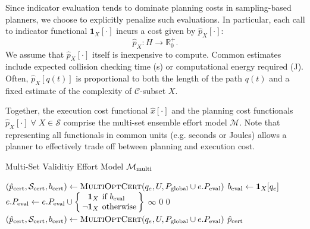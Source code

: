 Since indicator evaluation tends to dominate planning costs
in sampling-based planners,
we choose to explicitly penalize such evaluations.
In particular,
each call to indicator functional $\mathbf{1}_X[\cdot]$
incurs a cost given by ${\hat p}_X[\cdot]$:
\begin{equation}
  {\hat p}_X : H \rightarrow \mathbb{R}_0^+ .
\end{equation}
We assume that ${\hat p}_X[\cdot]$ itself is inexpensive to compute.
Common estimates include expected collision checking time (s)
or computational energy required (J).
Often, ${\hat p}_X[q(t)]$ is proportional to both
the length of the path $q(t)$
and a fixed estimate of the complexity of $\mathcal{C}$-subset $X$.

Together, the execution cost functional ${\hat x}[\cdot]$
and the planning cost functionals
${\hat p}_X[\cdot] \;\forall\; X \in \mathcal{S}$
comprise the multi-set ensemble effort model $\mathcal{M}$.
Note that representing all functionals in common units
(e.g. seconds or Joules) allows a planner
to effectively trade off between planning and execution cost.

\begin{algorithm}
\caption{Multi-Set Validitiy Effort Model
   $\mathcal{M}_{\mbox{\scriptsize multi}}$}
{\algrenewcommand\textproc{}%
\begin{algorithmic}[1]
   \State $({\hat p}_{\mbox{\scriptsize cert}}, \mathcal{S}_{\mbox{\scriptsize cert}}, b_{\mbox{\scriptsize cert}})
      \leftarrow \mbox{\sc MultiOptCert}(q_e, U,
      P_{\mbox{\scriptsize global}} \cup e.P_{\mbox{\scriptsize eval}})$
      \State $b_{\mbox{\scriptsize eval}} \leftarrow \mathbf{1}_X[q_e]$
      \State $\arraycolsep=2pt
         e.P_{\ms{eval}} \leftarrow e.P_{\ms{eval}} \cup
         \left\{\begin{array}{rl}
         \mathbf{1}_X & \mbox{if } b_{\ms{eval}} \\
         \lnot \mathbf{1}_X & \mbox{otherwise} \\
         \end{array}
         \right\}$
         \State \Return $\infty$
      \EndIf
   \EndFor
   \State \Return $0$
\EndFunction
{}
   \State \Return $0$
\EndFunction
{}
   \State $({\hat p}_{\mbox{\scriptsize cert}}, \mathcal{S}_{\mbox{\scriptsize cert}}, b_{\mbox{\scriptsize cert}})
      \leftarrow \mbox{\sc MultiOptCert}(q_e, U,
      P_{\mbox{\scriptsize global}} \cup e.P_{\mbox{\scriptsize eval}})$
   \State \Return ${\hat p}_{\mbox{\scriptsize cert}}$
\EndFunction
\end{algorithmic}
} %
\end{algorithm}

